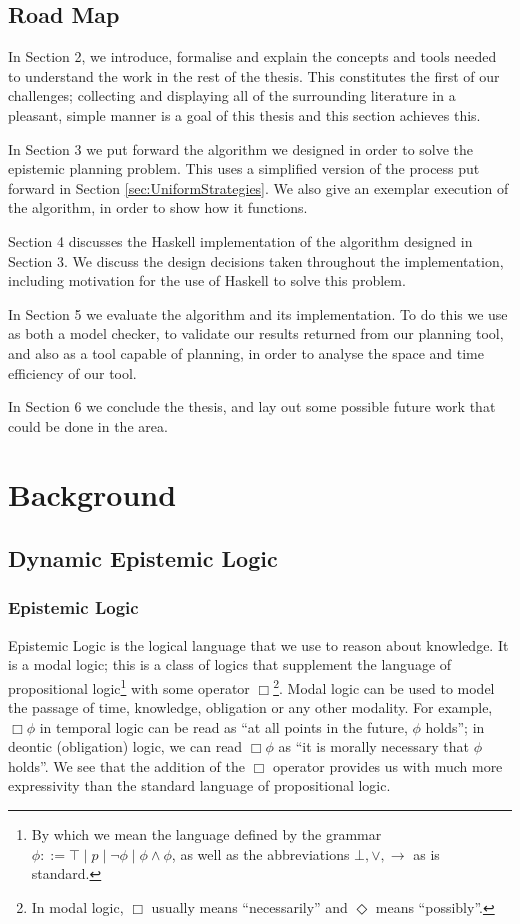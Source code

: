 \documentclass[ %
                    author={Leo Poulson},
                supervisor={Dr. Steven Ramsay},
                    degree={BSc},
                     title={Epistemic Planning for the Dynamic Gossip problem},
                  subtitle={},
                      year={2019} ]{dissertation}
\begin{document}
\section{Road Map}

In Section 2, we introduce, formalise and explain the concepts and tools needed
to understand the work in the rest of the thesis. This constitutes the first of
our challenges; collecting and displaying all of the surrounding literature in a
pleasant, simple manner is a goal of this thesis and this section achieves this.

In Section 3 we put forward the algorithm we designed in order to solve the
epistemic planning problem. This uses a simplified version of the process put
forward in Section \ref{sec:UniformStrategies}. We also give an exemplar execution of
the algorithm, in order to show how it functions.

Section 4 discusses the Haskell implementation of the algorithm designed in
Section 3. We discuss the design decisions taken throughout the implementation,
including motivation for the use of Haskell to solve this problem.

In Section 5 we evaluate the algorithm and its implementation. To do this we
use \cite{GithubGossip} as both a model checker, to validate our results
returned from our planning tool, and also as a tool capable of planning, in
order to analyse the space and time efficiency of our tool. 

In Section 6 we conclude the thesis, and lay out some possible future work that
could be done in the area. 

\newpage

\chapter{Background}

\section{Dynamic Epistemic Logic}
\label{sec:DEL}

\subsection{Epistemic Logic}

Epistemic Logic is the logical language that we use to reason about knowledge.
It is a modal logic; this is a class of logics that supplement the language of
propositional logic\footnote{By which we mean the language defined by the
  grammar $\phi ::= \top \mid p \mid \neg \phi \mid \phi \land \phi$, as well as
  the abbreviations $\bot, \lor, \rightarrow$ as is standard.} with some
operator $\Box$\footnote{In modal logic, $\Box$ usually means ``necessarily''
  and $\Diamond$ means ``possibly''.}. Modal logic can be used to model the
passage of time, knowledge, obligation or any other modality. For example, $\Box
\phi$ in temporal logic can be read as ``at all points in the future, $\phi$
holds''; in deontic (obligation) logic, we can read $\Box \phi$ as ``it is
morally necessary that $\phi$ holds''. We see that the addition of the $\Box$
operator provides us with much more expressivity than the standard language of
propositional logic.
\end{document}
